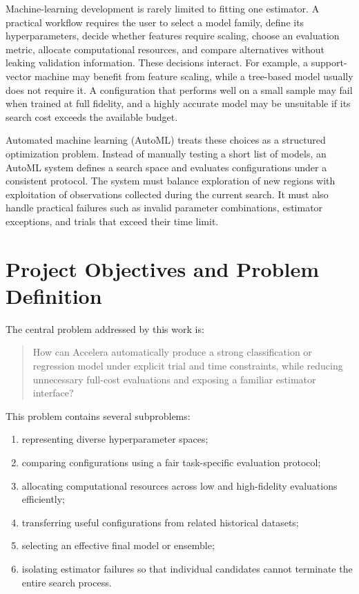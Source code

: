 \documentclass[12pt,a4paper,oneside]{report}
\begin{document}
Machine-learning development is rarely limited to fitting one estimator. A
practical workflow requires the user to select a model family, define
its hyperparameters, decide whether features require scaling, choose an
evaluation metric, allocate computational resources, and compare alternatives
without leaking validation information. These decisions interact. For
example, a support-vector machine may benefit from feature scaling, while a
tree-based model usually does not require it. A configuration that performs
well on a small sample may fail when trained at full fidelity, and a highly
accurate model may be unsuitable if its search cost exceeds the available
budget.

\medskip

\noindent Automated machine learning (AutoML) treats these choices as a structured
optimization problem. Instead of manually testing a short list of models, an
AutoML system defines a search space and evaluates configurations under a
consistent protocol. The system must balance exploration of new regions with
exploitation of observations collected during the current search. It must also
handle practical failures such as invalid parameter combinations, estimator
exceptions, and trials that exceed their time limit.

\section{Project Objectives and Problem Definition}

The central problem addressed by this work is:

\begin{quote}
How can Accelera automatically produce a strong classification or regression
model under explicit trial and time constraints, while reducing unnecessary
full-cost evaluations and exposing a familiar estimator interface?
\end{quote}

\noindent This problem contains several subproblems:

\begin{enumerate}[leftmargin=*]
  \item representing diverse hyperparameter spaces;
  \item comparing configurations using a fair task-specific evaluation protocol;
  \item allocating computational resources across low and high-fidelity evaluations efficiently;
  \item transferring useful configurations from related historical datasets;
  \item selecting an effective final model or ensemble;
  \item isolating estimator failures so that individual candidates cannot terminate the entire search process.
\end{enumerate}
\end{document}
